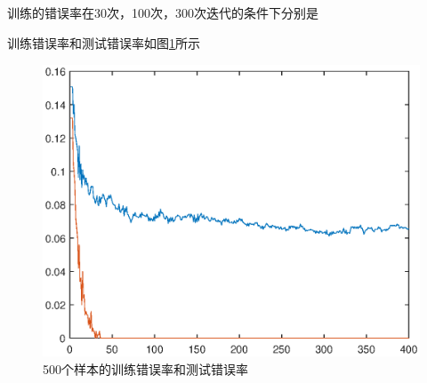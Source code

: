\documentclass[UTF8,a4paper]{paper}
\begin{document}
\subsection{}
训练的错误率在30次，100次，300次迭代的条件下分别是

训练错误率和测试错误率如图\ref{fig1}所示
\begin{figure}
\centering
\includegraphics[width=\textwidth]{500trained.eps}
\caption{500个样本的训练错误率和测试错误率}
\label{fig1}
\end{figure}
\end{document}
